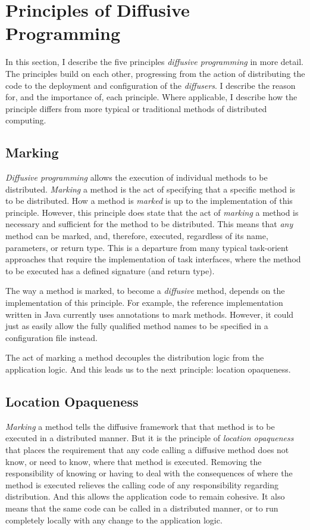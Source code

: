 \documentclass[11pt]{article}
\begin{document}
%
%
\section{Principles of Diffusive Programming}
In this section, I describe the five principles \emph{diffusive programming} in more detail. The principles build on each other, progressing from the action of distributing the code to the deployment and configuration of the \emph{diffusers}. I describe the reason for, and the importance of, each principle. Where applicable, I describe how the principle differs from more typical or traditional methods of distributed computing.

\subsection{Marking}
\emph{Diffusive programming} allows the execution of individual methods to be distributed. \emph{Marking} a method is the act of specifying that a specific method is to be distributed. How a method is \emph{marked} is up to the implementation of this principle. However, this principle does state that the act of \emph{marking} a method is necessary and sufficient for the method to be distributed. This means that \emph{any} method can be marked, and, therefore, executed, regardless of its name, parameters, or return type. This is a departure from many typical task-orient approaches that require the implementation of task interfaces, where the method to be executed has a defined signature (and return type).

The way a method is marked, to become a \emph{diffusive} method, depends on the implementation of this principle. For example, the reference implementation written in Java currently uses annotations to mark methods. However, it could just as easily allow the fully qualified method names to be specified in a configuration file instead.

The act of marking a method decouples the distribution logic from the application logic. And this leads us to the next principle: location opaqueness.

\subsection{Location Opaqueness}
\emph{Marking} a method tells the diffusive framework that that method is to be executed in a distributed manner. But it is the principle of \emph{location opaqueness} that places the requirement that any code calling a diffusive method does not know, or need to know, where that method is executed. Removing the responsibility of knowing or having to deal with the consequences of where the method is executed relieves the calling code of any responsibility regarding distribution. And this allows the application code to remain cohesive. It also means that the same code can be called in a distributed manner, or to run completely locally with any change to the application logic.
\end{document}

